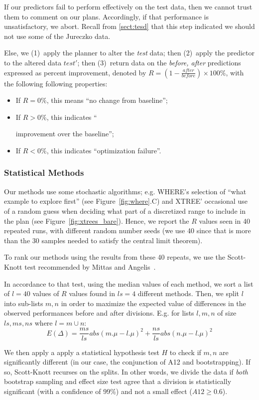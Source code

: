 \documentclass{sig-alternate}
\newcommand{\bi}{\begin{itemize}}
\newcommand{\ei}{\end{itemize}}
\newcommand{\tion}[1]{\textsection\ref{sect:#1}}
\newcommand{\fig}[1]{Figure~\ref{fig:#1}}
\begin{document}
If our { predictors} fail to perform effectively on the test data,
then we cannot trust them to comment on our plans. Accordingly,
if that performance is unsatisfactory, we abort. Recall from \tion{tesd} that this step indicated
we should not use some of the  Jureczko data.

Else, we (1)~apply the { planner} to alter the {\em test} data;
then (2)~apply the { predictor} to the altered data $test'$;
then (3)~return data on the {\em before, after} predictions expressed as percent improvement, denoted by  $R=(1-\frac{\mathit{after}}{\mathit{before}})\times100\%$, with the following following properties:
\bi
\item If $R  = 0\%$, this means  ``no change from baseline''; 
\item If $R \gt 0\%$, this indicates ``

improvement over the baseline'';
\item If $R \lt 0\%$, this indicates ``optimization failure''.
\ei
 \subsubsection{Statistical Methods}
 Our methods use some stochastic algorithms; e.g. WHERE's selection of ``what example to explore first'' (see \fig{where}.C) and
  XTREE' occasional use of a random guess when deciding what part of a discretized range to include in the plan
  (see \fig{xtrees_bare}). Hence, we report the $R$ values seen in 40 repeated runs,
  with different random number seeds
(we use 40 since that is  more than the 30 samples  needed
to satisfy the central limit theorem).

  To rank our methods using the results from these 40
  repeats, we use the Scott-Knott test recommended by Mittas and  Angelis~\cite{mittas13}. 

In accordance to that test, using the median values of each method, we
sort a list of  $l=40$ values of $R$ values found in  $ls=4$ different methods. 
Then, we
split $l$ into sub-lists $m,n$ in order to maximize the expected value of
 differences  in the observed performances
before and after divisions. E.g. for lists $l,m,n$ of size $ls,ms,ns$ where $l=m\cup n$:
 \[E(\Delta)=\frac{ms}{ls}abs(m.\mu - l.\mu)^2 + \frac{ns}{ls}abs(n.\mu - l.\mu)^2\]

We then apply a apply a statistical hypothesis test $H$ to check
if $m,n$ are significantly different  (in our case, the conjunction of A12 and bootstrapping). 
If so, Scott-Knott  recurses on the splits.
In other words, we divide the data if \textit{both} bootstrap sampling and effect size test agree that a division is statistically significant (with a confidence of 99\%) and not a small effect ($A12 \ge 0.6$).
\end{document}
